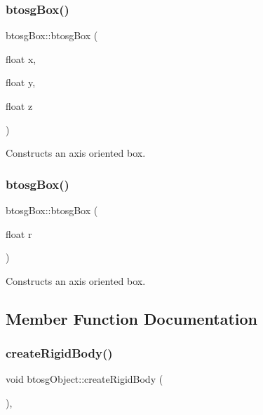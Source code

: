\subsubsection{\texorpdfstring{btosg\+Box()}{btosgBox()}\hspace{0.1cm}{\footnotesize\ttfamily [2/3]}}
{\footnotesize\ttfamily btosg\+Box\+::btosg\+Box (\begin{DoxyParamCaption}\item[{float}]{x,  }\item[{float}]{y,  }\item[{float}]{z }\end{DoxyParamCaption})\hspace{0.3cm}{\ttfamily [inline]}}

Constructs an axis oriented box. \mbox{\label{classbtosgBox_a3b17e84e3f94aabdc7b8517bd802a5c9}} 
\subsubsection{\texorpdfstring{btosg\+Box()}{btosgBox()}\hspace{0.1cm}{\footnotesize\ttfamily [3/3]}}
{\footnotesize\ttfamily btosg\+Box\+::btosg\+Box (\begin{DoxyParamCaption}\item[{float}]{r }\end{DoxyParamCaption})\hspace{0.3cm}{\ttfamily [inline]}}

Constructs an axis oriented box. 

\subsection{Member Function Documentation}
\mbox{\label{classbtosgObject_a029dbe9134fa94e7355799f67fb2cd6d}} 
\subsubsection{\texorpdfstring{create\+Rigid\+Body()}{createRigidBody()}}
{\footnotesize\ttfamily void btosg\+Object\+::create\+Rigid\+Body (\begin{DoxyParamCaption}{ }\end{DoxyParamCaption})\hspace{0.3cm}{\ttfamily [inline]}, {\ttfamily [inherited]}}


